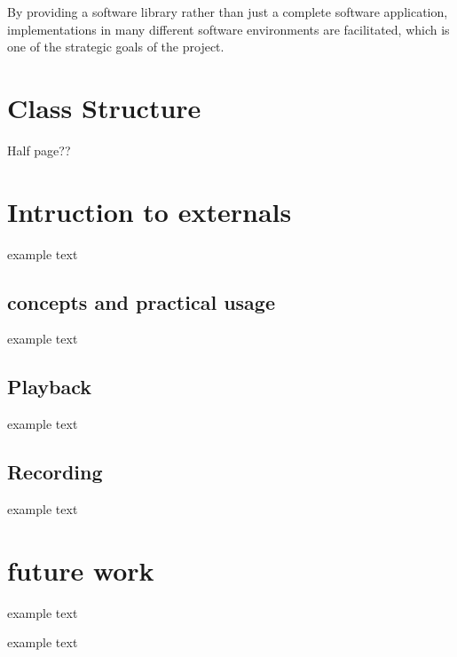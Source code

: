 \documentclass{article}
\begin{document}
By providing a software library rather than just a complete software application, implementations in many different software environments are facilitated, which is one of the strategic goals of the project.


\section{Class Structure}\label{sec:class_structure}
Half page??

\section{Intruction to externals}
example text

\subsection{concepts and practical usage}\label{subsec:concepts}
example text

\subsection{Playback}\label{sec:Playback}
example text

\subsection{Recording}\label{sub:body}
example text

\section{future work}
example text


\begin{acknowledgments}
example text
\end{acknowledgments} 


\end{document}

